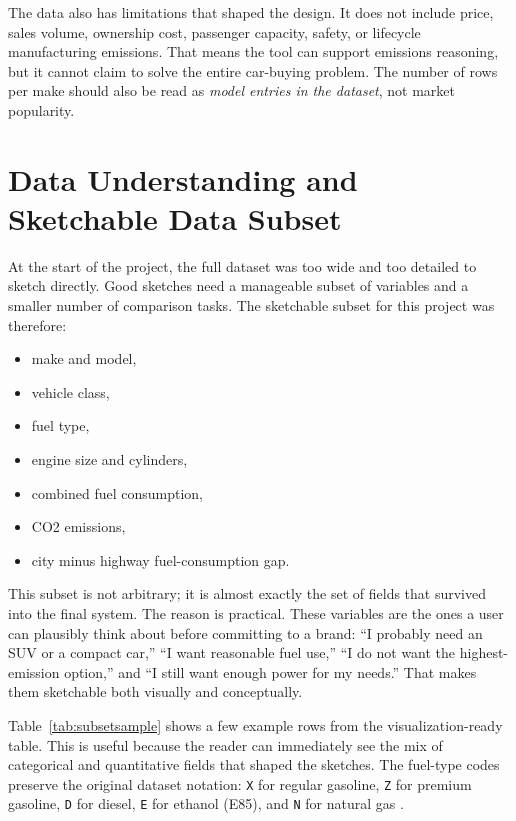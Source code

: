 \documentclass[12pt,letterpaper]{article}
\begin{document}
The data also has limitations that shaped the design. It does not include price, sales volume, ownership cost, passenger capacity, safety, or lifecycle manufacturing emissions. That means the tool can support emissions reasoning, but it cannot claim to solve the entire car-buying problem. The number of rows per make should also be read as \emph{model entries in the dataset}, not market popularity.

\section{Data Understanding and Sketchable Data Subset}
At the start of the project, the full dataset was too wide and too detailed to sketch directly. Good sketches need a manageable subset of variables and a smaller number of comparison tasks. The sketchable subset for this project was therefore:

\begin{itemize}
\item make and model,
\item vehicle class,
\item fuel type,
\item engine size and cylinders,
\item combined fuel consumption,
\item CO2 emissions,
\item city minus highway fuel-consumption gap.
\end{itemize}

This subset is not arbitrary; it is almost exactly the set of fields that survived into the final system. The reason is practical. These variables are the ones a user can plausibly think about before committing to a brand: ``I probably need an SUV or a compact car,'' ``I want reasonable fuel use,'' ``I do not want the highest-emission option,'' and ``I still want enough power for my needs.'' That makes them sketchable both visually and conceptually.

Table~\ref{tab:subsetsample} shows a few example rows from the visualization-ready table. This is useful because the reader can immediately see the mix of categorical and quantitative fields that shaped the sketches. The fuel-type codes preserve the original dataset notation: \texttt{X} for regular gasoline, \texttt{Z} for premium gasoline, \texttt{D} for diesel, \texttt{E} for ethanol (E85), and \texttt{N} for natural gas \cite{datadescription}.
\end{document}
